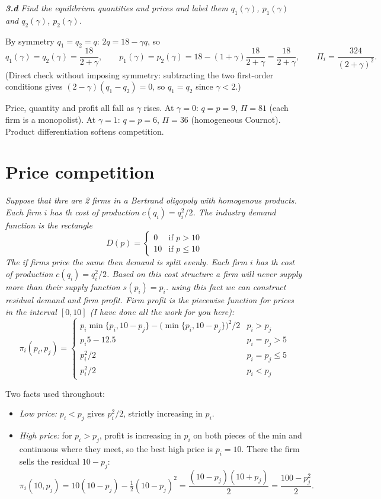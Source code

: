 \documentclass[11pt]{article}
\newcommand{\question}[1]{\par\smallskip\noindent\colorbox{black!6}{\parbox{\dimexpr\linewidth-2\fboxsep}{\itshape #1}}\par\smallskip}
\begin{document}
\question{\textbf{3.d} Find the equilibrium quantities and prices and label them $q_1(\gamma)$, $p_1(\gamma)$ and $q_2(\gamma)$, $p_2(\gamma)$.}

By symmetry $q_1=q_2=q$: $2q=18-\gamma q$, so
\[
q_1(\gamma)=q_2(\gamma)=\frac{18}{2+\gamma},\qquad
p_1(\gamma)=p_2(\gamma)=18-(1+\gamma)\frac{18}{2+\gamma}=\frac{18}{2+\gamma},
\qquad \Pi_i=\frac{324}{(2+\gamma)^2}.
\]
(Direct check without imposing symmetry: subtracting the two first-order conditions gives $(2-\gamma)(q_1-q_2)=0$, so $q_1=q_2$ since $\gamma<2$.)

Price, quantity and profit all fall as $\gamma$ rises. At $\gamma=0$: $q=p=9$, $\Pi=81$ (each firm is a monopolist). At $\gamma=1$: $q=p=6$, $\Pi=36$ (homogeneous Cournot). Product differentiation softens competition.

\section{Price competition}

\question{Suppose that thre are 2 firms in a Bertrand oligopoly with homogenous products. Each firm $i$ has th cost of production $c(q_i)=q_i^2/2$. The industry demand function is the rectangle
\[
D(p)=\begin{cases}0 & \text{if } p>10\\ 10 & \text{if } p\le 10\end{cases}
\]
The if firms price the same then demand is split evenly. Each firm $i$ has th cost of production $c(q_i)=q_i^2/2$. Based on this cost structure a firm will never supply more than their supply function $s(p_i)=p_i$. using this fact we can construct residual demand and firm profit. Firm profit is the piecewise function for prices in the interval $[0,10]$ (I have done all the work for you here):
\[
\pi_i(p_i,p_j)=\begin{cases}
p_i\min\{p_i,10-p_j\}-\big(\min\{p_i,10-p_j\}\big)^2/2 & p_i>p_j\\
p_i5-12.5 & p_i=p_j>5\\
p_i^2/2 & p_i=p_j\le5\\
p_i^2/2 & p_i<p_j
\end{cases}
\]}

Two facts used throughout:
\begin{itemize}
\item[(A)] \emph{Low price:} $p_i<p_j$ gives $p_i^2/2$, strictly increasing in $p_i$.
\item[(B)] \emph{High price:} for $p_i>p_j$, profit is increasing in $p_i$ on both pieces of the min and continuous where they meet, so the best high price is $p_i=10$. There the firm sells the residual $10-p_j$:
\[
\pi_i(10,p_j)=10(10-p_j)-\tfrac12(10-p_j)^2=\frac{(10-p_j)(10+p_j)}{2}=\frac{100-p_j^2}{2}.
\]
\end{itemize}
\end{document}
